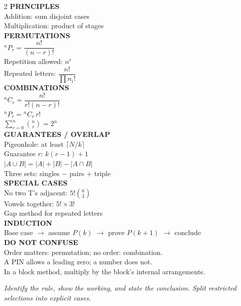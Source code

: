 \documentclass[11pt,a4paper]{article}
\begin{document}
\begin{multicols}{2}
\textbf{PRINCIPLES}\\
Addition: sum disjoint cases\\
Multiplication: product of stages\\[4pt]
\textbf{PERMUTATIONS}\\
${}^nP_r=\dfrac{n!}{(n-r)!}$\\
Repetition allowed: $n^r$\\
Repeated letters: $\dfrac{n!}{\prod n_i!}$\\[4pt]
\textbf{COMBINATIONS}\\
${}^nC_r=\dfrac{n!}{r!(n-r)!}$\\
${}^nP_r={}^nC_r\,r!$\\
$\sum_{r=0}^n\binom nr=2^n$\\[4pt]
\textbf{GUARANTEES / OVERLAP}\\
Pigeonhole: at least $\lceil N/k\rceil$\\
Guarantee $r$: $k(r-1)+1$\\
$|A\cup B|=|A|+|B|-|A\cap B|$\\
Three sets: singles $-$ pairs $+$ triple\\[4pt]
\textbf{SPECIAL CASES}\\
No two T's adjacent: $5!\binom63$\\
Vowels together: $5!\times3!$\\
Gap method for repeated letters\\[4pt]
\textbf{INDUCTION}\\
Base case $\to$ assume $P(k)$ $\to$ prove $P(k+1)$ $\to$ conclude\\[4pt]
\textbf{DO NOT CONFUSE}\\
Order matters: permutation; no order: combination.\\
A PIN allows a leading zero; a number does not.\\
In a block method, multiply by the block's internal arrangements.
\end{multicols}

\vfill
\begin{center}\textit{Identify the rule, show the working, and state the conclusion. Split restricted selections into explicit cases.}\end{center}
\end{document}

